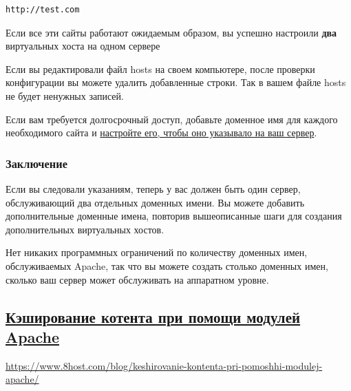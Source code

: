 \documentclass[14pt, a4paper]{article}
\begin{document}
\begin{lstlisting}
http://test.com
\end{lstlisting}
\begin{figure}[h]%
    \centering
    \label{1.13}
\end{figure}

Если все эти сайты работают ожидаемым образом, вы успешно настроили \textbf{два} виртуальных хоста на одном сервере

Если вы редактировали файл hosts на своем компьютере, после проверки конфигурации вы можете 
удалить добавленные строки. Так в вашем файле hosts не будет ненужных записей.

Если вам требуется долгосрочный доступ, добавьте доменное имя для каждого необходимого сайта и \href{https://www.digitalocean.com/docs/networking/dns/}{настройте 
его, чтобы оно указывало на ваш сервер}.


\subsubsection*{Заключение}

Если вы следовали указаниям, теперь у вас должен быть один сервер, обслуживающий два отдельных доменных 
имени. Вы можете добавить дополнительные доменные имена, повторив вышеописанные шаги для создания 
дополнительных виртуальных хостов.

Нет никаких программных ограничений по количеству доменных имен, обслуживаемых Apache, так что вы можете 
создать столько доменных имен, сколько ваш сервер может обслуживать на аппаратном уровне.


\subsection*{\href{https://www.8host.com/blog/keshirovanie-kontenta-pri-pomoshhi-modulej-apache/}{Кэширование котента при помощи модулей Apache}}

\href{https://www.8host.com/blog/keshirovanie-kontenta-pri-pomoshhi-modulej-apache/}
{https://www.8host.com/blog/keshirovanie-kontenta-pri-pomoshhi-modulej-apache/}
\end{document}
